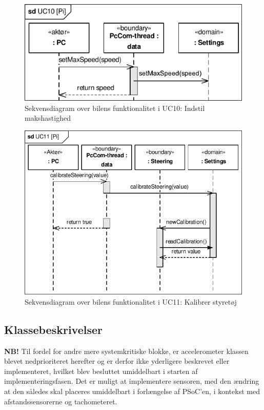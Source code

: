 \begin{figure}[h]
\centering
\includegraphics[]{../fig/diagrammer/bil/sd_uc10.pdf}
\caption{Sekvensdiagram over  bilens funktionalitet i UC10: Indstil makshastighed}
\label{fig:sd_uc10_bil}
\end{figure}

\begin{figure}[h]
\centering
\includegraphics[]{../fig/diagrammer/bil/sd_uc11.pdf}
\caption{Sekvensdiagram over  bilens funktionalitet i UC11: Kalibrer styretøj}
\label{fig:sd_uc11_bil}
\end{figure}

\clearpage
\subsection{Klassebeskrivelser}

\clearpage

\clearpage

\clearpage

\clearpage

\clearpage

\clearpage

\clearpage


\textbf{NB!}
Til fordel for andre mere systemkritiske blokke, er accelerometer klassen blevet nedprioriteret herefter og er derfor ikke yderligere beskrevet eller implementeret, hvilket blev besluttet umiddelbart i starten af implementeringsfasen. Det er muligt at implementere sensoren, med den ændring at den således skal placeres umiddelbart i forlængelse af PSoC'en, i kontekst med afstandssensorerne og tachometeret.